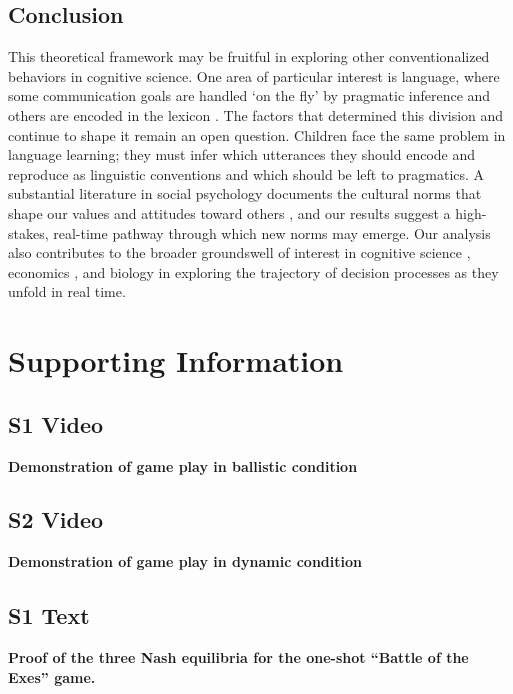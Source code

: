 \documentclass[10pt,letterpaper]{article}
\begin{document}
\subsection*{Conclusion}

This theoretical framework may be fruitful in exploring other conventionalized behaviors in cognitive science. One area of particular interest is language, where some communication goals are handled `on the fly' by pragmatic inference and others are encoded in the lexicon \cite{Grice75_LogicConversation, GarrodDoherty94_GroupConventionsLinguistics}. The factors that determined this division and continue to shape it remain an open question. Children face the same problem in language learning; they must infer which utterances they should encode and reproduce as linguistic conventions and which should be left to pragmatics. A substantial literature in social psychology documents the cultural norms that shape our values and attitudes toward others \cite{Bicchieri05_DynamicsSocialNorms}, and our results suggest a high-stakes, real-time pathway through which new norms may emerge. Our analysis also contributes to the broader groundswell of interest in cognitive science \cite{SpiveyDale06, KoopJohnson11, Beer00}, economics \cite{OpreaCharnessFriedman14_ContinuousTime, FriedmanOprea12_ContinuousDilemma}, and biology \cite{vanDoornRiebliTaborsky14_CoactionReciprocityContinuousTime} in exploring the trajectory of decision processes as they unfold in real time. 

\section*{Supporting Information}

\subsection*{S1 Video}
\label{S1_Video}
{\bf Demonstration of game play in ballistic condition}

\subsection*{S2 Video}
\label{S2_Video}
{\bf Demonstration of game play in dynamic condition}

\subsection*{S1 Text}
\label{S1_Text}
{\bf Proof of the three Nash equilibria for the one-shot ``Battle of the Exes'' game.}  
\end{document}
